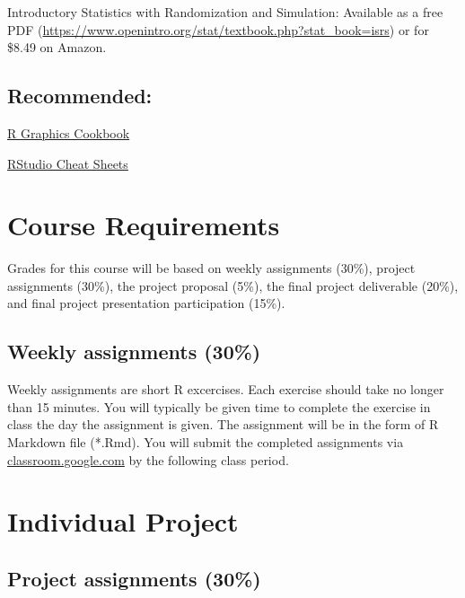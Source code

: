 \documentclass[]{book}
\theoremstyle{definition}
\theoremstyle{definition}
\theoremstyle{remark}
\begin{document}
Introductory Statistics with Randomization and Simulation: Available as
a free PDF
(\url{https://www.openintro.org/stat/textbook.php?stat_book=isrs}) or
for \$8.49 on Amazon.

\subsection*{Recommended:}\label{recommended}

\href{https://www.cookbook-r.com/Graphs}{R Graphics Cookbook}

\href{https://www.rstudio.com/resources/cheatsheets/}{RStudio Cheat
Sheets}

\section*{Course Requirements}\label{course-requirements}

Grades for this course will be based on weekly assignments (30\%),
project assignments (30\%), the project proposal (5\%), the final
project deliverable (20\%), and final project presentation participation
(15\%).

\subsection*{Weekly assignments (30\%)}\label{weekly-assignments-30}

Weekly assignments are short R excercises. Each exercise should take no
longer than 15 minutes. You will typically be given time to complete the
exercise in class the day the assignment is given. The assignment will
be in the form of R Markdown file (*.Rmd). You will submit the completed
assignments via \href{https//classroom.google.com}{classroom.google.com}
by the following class period.

\section*{Individual Project}\label{individual-project}

\subsection*{Project assignments (30\%)}\label{project-assignments-30}
\end{document}
